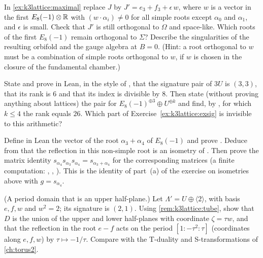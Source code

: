 \begin{exercise}[$\star\star$]
In \cref{ex:k3lattice:maximal} replace $J$ by $J'=e_3+f_3+\epsilon\,w$, where $w$ is a vector
in the first $E_8(-1)\otimes\mathbb{R}$ with $(w\cdot\alpha_i)\ne0$ for all simple roots except
$\alpha_0$ and $\alpha_1$, and $\epsilon$ is small. Check that $J'$ is still orthogonal to
$\Omega$ and space-like. Which roots of the first $E_8(-1)$ remain orthogonal to $\Sigma$?
Describe the singularities of the resulting orbifold and the gauge algebra at $B=0$. (Hint:
a root orthogonal to $w$ must be a combination of simple roots orthogonal to $w$, if $w$ is
chosen in the closure of the fundamental chamber.)
\end{exercise}

\begin{exercise}\label{ex:k3lattice:exlean1}
State and prove in Lean, in the style of , that the signature pair of
$3U$ is $(3,3)$, that its rank is $6$ and that its index is divisible by $8$. Then state
(without proving anything about lattices) the pair for $E_8(-1)^{\oplus3}\oplus U^{\oplus k}$
and find, by , for which $k\le4$ the rank equals $26$. Which part of
Exercise~\ref{ex:k3lattice:exsig} is invisible to this arithmetic?
\end{exercise}

\begin{exercise}\label{ex:k3lattice:exlean2}
Define in Lean the vector  of the root $\alpha_3+\alpha_4$ of $E_8(-1)$
and prove . Deduce from  that the
reflection in this non-simple root is an isometry of . Then prove the matrix
identity $s_{\alpha_4}s_{\alpha_3}s_{\alpha_4}=s_{\alpha_3+\alpha_4}$ for the corresponding
 matrices (a finite computation: , ,
). This is the identity of part~(a) of the exercise on isometries above with
$g=s_{\alpha_4}$.
\end{exercise}

\begin{exercise}[$\star\star\star$]
(A period domain that is an upper half-plane.) Let $\Lambda'=U\oplus\langle2\rangle$, with
basis $e,f,w$ and $w^2=2$; its signature is $(2,1)$. Using \cref{rem:k3lattice:tube}, show that $D$ is the union of the
upper and lower half-planes with coordinate $\zeta=\tau w$, and that the reflection in the
root $e-f$ acts on the period $[1:-\tau^2:\tau]$ (coordinates along $e,f,w$) by
$\tau\mapsto-1/\tau$. Compare with the T-duality and S-transformations of
\cref{ch:torus2}.
\end{exercise}

